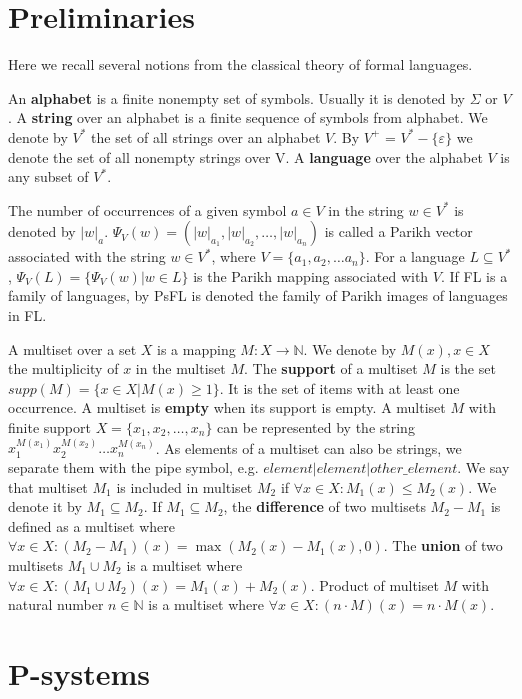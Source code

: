 \documentclass[llncs,submission,copyright,creativecommons]{../lib/lncs/llncs}
\def\eps{\varepsilon}
\begin{document}
\section{Preliminaries}
\label{sec:preliminaries}

Here we recall several notions from the classical theory of formal languages.

An {\bf alphabet} is a finite nonempty set of symbols. Usually it is denoted by $\Sigma$ or $V$. A {\bf string} over an alphabet is a finite sequence of symbols from alphabet. We denote by $V^*$ the set of all strings over an alphabet $V$. By $V^+$ = $V^* - \{\eps\}$ we denote the set of all nonempty strings over V. A {\bf language} over the alphabet $V$ is any subset of $V^*$.

The number of occurrences of a given symbol $a\in V$ in the string $w\in V^*$ is denoted by $|w|_a$. $\Psi_V(w)=(|w|_{a_1},|w|_{a_2},\dots,|w|_{a_n})$ is called a Parikh vector associated with the string $w\in V^*$, where $V=\{a_1,a_2,\dots a_n\}$. For a language $L\subseteq V^*$, $\Psi_V(L)=\{\Psi_V(w)|w\in L\}$ is the Parikh mapping associated with $V$. If FL is a family of languages, by PsFL is denoted the family of Parikh images of languages in FL.

A multiset over a set $X$ is a mapping $M: X\rightarrow \mathbb N$.
We denote by $M(x), x\in X$ the multiplicity of $x$ in the multiset $M$.
The {\bf support} of a multiset $M$ is the set $supp(M)=\{x\in X|M(x)\geq 1\}$.
It is the set of items with at least one occurrence.
A multiset is {\bf empty} when its support is empty.
A multiset $M$ with finite support $X = \{x_1, x_2, \dots, x_n\}$ can be represented by the string $x_1^{M(x_1)}x_2^{M(x_2)}\dots x_n^{M(x_n)}$.
As elements of a multiset can also be strings, we separate them with the pipe symbol, e.g. $element|element|other\_element$.
We say that multiset $M_1$ is included in multiset $M_2$ if $\forall x \in X: M_1(x)\leq M_2(x)$.
We denote it by $M_1\subseteq M_2$.
If $M_1\subseteq M_2$, the {\bf difference} of two multisets $M_2-M_1$ is defined as a multiset where $\forall x \in X: (M_2-M_1)(x)=\max(M_2(x)-M_1(x),0)$.
The {\bf union} of two multisets $M_1\cup M_2$ is a multiset where $\forall x \in X: (M_1\cup M_2)(x)=M_1(x)+M_2(x)$.
Product of multiset $M$ with natural number $n\in \mathbb N$ is a multiset where $\forall x \in X: (n\cdot M)(x)=n\cdot M(x)$.
  
\section{P-systems}
\label{sec:p-systems}
\end{document}
